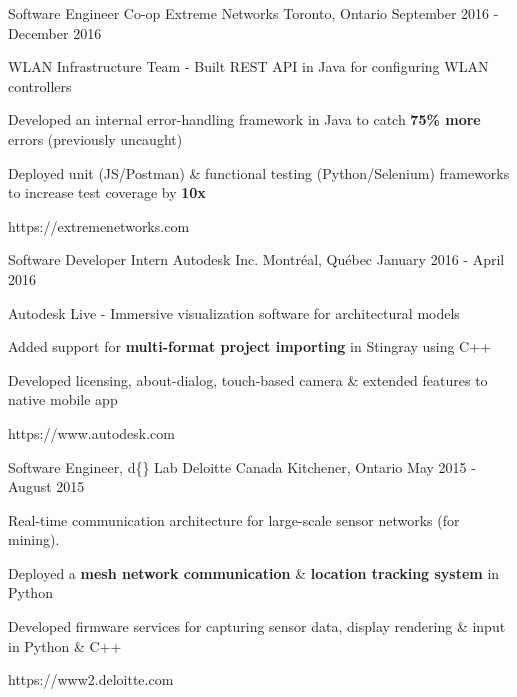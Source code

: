 \begin{cventries}

\cventrylink
{Software Engineer Co-op}
{Extreme Networks}
{Toronto, Ontario}
{September 2016 - December 2016}
{ %
WLAN Infrastructure Team - Built REST API in Java for configuring WLAN controllers
\begin{cvitems}
\item[]
\item {Developed an internal error-handling framework in Java to catch \textbf{75\% more} errors (previously uncaught)}
\item {Deployed unit (JS/Postman) \& functional testing (Python/Selenium) frameworks to increase test coverage by \textbf{10x}}
\end{cvitems}
}
{https://extremenetworks.com}


\cventrylink
{Software Developer Intern}
{Autodesk Inc.}
{Montréal, Québec}
{January 2016 - April 2016}
{ %
Autodesk Live - Immersive visualization software for architectural models
\begin{cvitems}
\item[]
\item {Added support for \textbf{multi-format project importing} in Stingray using C++}
\item {Developed licensing, about-dialog, touch-based camera \& extended features to native mobile app}
\end{cvitems}
}
{https://www.autodesk.com}


\cventrylink
{Software Engineer, d\{\} Lab}
{Deloitte Canada} %
{Kitchener, Ontario} %
{May 2015 - August 2015} %
{
Real-time communication architecture for large-scale sensor networks (for mining).
\begin{cvitems}
\item[]
\item {Deployed a \textbf{mesh network communication} \& \textbf{location tracking system} in Python}
\item {Developed firmware services for capturing sensor data, display rendering \& input in Python \& C++}
\end{cvitems}
}
{https://www2.deloitte.com}



\end{cventries}

